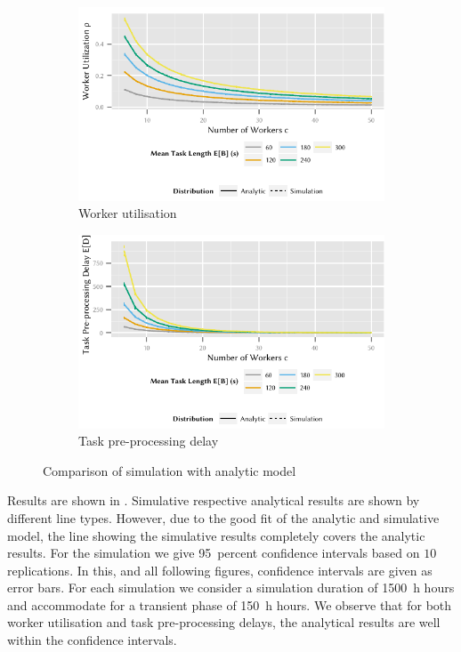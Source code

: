 \begin{figure}
	\centering
	\begin{subfigure}{\columnwidth}
		\includegraphics{cloud/crowdsourcing/model/figures/comparison_utilization}
		\caption{Worker utilisation}
		\label{fig:cloud:crowdsourcing:validation:model:utilization}
	\end{subfigure}

	\begin{subfigure}{\columnwidth}
		\includegraphics{cloud/crowdsourcing/model/figures/comparison_task_delay}
		\caption{Task pre-processing delay}
		\label{fig:cloud:crowdsourcing:validation:model:task_delay}
	\end{subfigure}
	\caption{Comparison of simulation with analytic model}
	\label{fig:cloud:crowdsourcing:validation:model}
\end{figure}

Results are shown in .
Simulative respective analytical results are shown by different line types.
However, due to the good fit of the analytic and simulative model, the line showing the simulative results completely covers the analytic results.
For the simulation we give \SI{95}{percent} confidence intervals based on \(10\) replications.
In this, and all following figures, confidence intervals are given as error bars.
For each simulation we consider a simulation duration of \SI{1500}{\hour} hours and accommodate for a transient phase of \SI{150}{\hour} hours.
We observe that for both worker utilisation and task pre-processing delays, the analytical results are well within the confidence intervals.